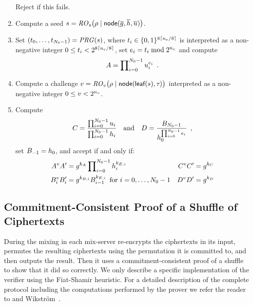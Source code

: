 \documentclass[11pt]{article}
\begin{document}
\begin{nicebox}
\begin{algorithm}
\begin{enumerate}
\begin{enumerate}
    \end{enumerate}
    Reject if this fails.

  \item Compute a seed
    $s=\mathit{RO}_s\big(\rho\mid\textsf{node}(\overline{g},\overline{h},\overline{u})\big)$.

  \item Set $(t_0,\ldots,t_{N_{0}-1})=\mathit{PRG}(s)$, where
    $t_i\in\{0,1\}^{8\lceil{n_e}/8\rceil}$ is interpreted as a
    non-negative integer $0\leq t_i<2^{8\lceil{n_e}/8\rceil}$, set $e_i=t_i\bmod 2^{{n_e}}$ and compute
    \begin{align*}
      A=\prod\nolimits_{i=0}^{N_{0}-1}u_{i}^{e_i}\enspace .
    \end{align*}

  \item Compute a challenge
    $v=\mathit{RO}_v\big(\rho\mid\textsf{node}(\textsf{leaf}(s),\tau_{})\big)$ interpreted as a
    non-negative integer $0\leq v<2^{n_v}$.

  \item Compute
    \begin{align*}
      C=\frac{\prod\nolimits_{i=0}^{N_{0}-1}u_{i}}{\prod\nolimits_{i=0}^{N_{0}-1}h_{i}}\quad\text{and}\quad D=\frac{B_{N_{0}-1}}{h_{0}^{\prod_{i=0}^{N_{0}-1}e_i}}\enspace,
    \end{align*}
    set $B_{-1}=h_{0}$, and accept if and only if:
    \begin{align*}
      A^vA'&=g^{k_A}\prod\nolimits_{i=0}^{N_{0}-1}h_{i}^{k_{E,i}}
      &C^vC'&=g^{k_C}\\
      B_i^vB_i'&=g^{k_{B,i}}B_{i-1}^{k_{E,i}}\enspace\text{for $i=0,\ldots,N_{0}-1$}
      &D^vD'&=g^{k_D}
    \end{align*}
  \end{enumerate}
  
\end{algorithm}
\end{nicebox}

\subsection{Commitment-Consistent Proof of a Shuffle of Ciphertexts}\label{sect:ccpos}

During the mixing in \veri each mix-server re-encrypts the ciphertexts
in its input, permutes the resulting ciphertexts using the permutation
it is committed to, and then outputs the result. Then it uses a
commitment-consistent proof of a shuffle to show that it did so
correctly. We only describe a specific implementation of the verifier
using the Fiat-Shamir heuristic. For a detailed description of the
complete protocol including the computations performed by the prover
we refer the reader to  and
Wikstr{\"o}m~\cite{wik09b}.
\end{document}
